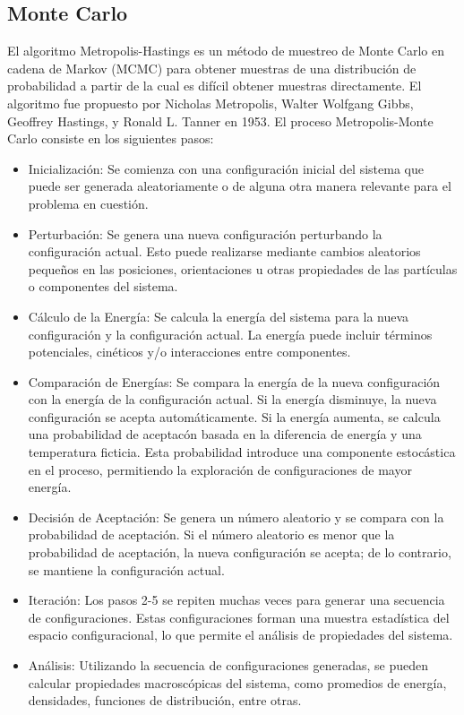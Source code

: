 \subsection{Monte Carlo}

El algoritmo Metropolis-Hastings es un m\'etodo de muestreo de Monte Carlo en cadena de Markov (MCMC)  para obtener muestras de una distribuci\'on de probabilidad a partir de la cual es dif\'icil obtener muestras directamente. El algoritmo fue propuesto por Nicholas Metropolis, Walter Wolfgang Gibbs, Geoffrey Hastings, y Ronald L. Tanner en 1953. \addcite
El proceso Metropolis-Monte Carlo consiste en los siguientes pasos:


\begin{itemize}
	

\item Inicializaci\'on: Se comienza con una configuraci\'on inicial del sistema que puede ser generada aleatoriamente o de alguna otra manera relevante para el problema en cuesti\'on.

\item Perturbaci\'on: Se genera una nueva configuraci\'on perturbando la configuraci\'on actual. Esto puede realizarse mediante cambios aleatorios peque\~nos en las posiciones, orientaciones u otras propiedades de las part\'iculas o componentes del sistema.

\item C\'alculo de la Energ\'ia: Se calcula la energ\'ia del sistema para la nueva configuraci\'on y la configuraci\'on actual. La energ\'ia puede incluir t\'erminos potenciales, cin\'eticos y/o interacciones entre componentes.

\item Comparaci\'on de Energ\'ias: Se compara la energ\'ia de la nueva configuraci\'on con la energ\'ia de la configuraci\'on actual. Si la energ\'ia disminuye, la nueva configuraci\'on se acepta autom\'aticamente. Si la energ\'ia aumenta, se calcula una probabilidad de aceptac\'on basada en la diferencia de energ\'ia y una temperatura ficticia. Esta probabilidad introduce una componente estoc\'astica en el proceso, permitiendo la exploraci\'on de configuraciones de mayor energ\'ia.

\item Decisi\'on de Aceptaci\'on: Se genera un n\'umero aleatorio y se compara con la probabilidad de aceptaci\'on. Si el n\'umero aleatorio es menor que la probabilidad de aceptaci\'on, la nueva configuraci\'on se acepta; de lo contrario, se mantiene la configuración actual.

\item Iteraci\'on: Los pasos 2-5 se repiten muchas veces para generar una secuencia de configuraciones. Estas configuraciones forman una muestra estad\'istica del espacio configuracional, lo que permite el an\'alisis de propiedades del sistema.

\item An\'alisis: Utilizando la secuencia de configuraciones generadas, se pueden calcular propiedades macrosc\'opicas del sistema, como promedios de energ\'ia, densidades, funciones de distribuci\'on, entre otras.
\end{itemize}

